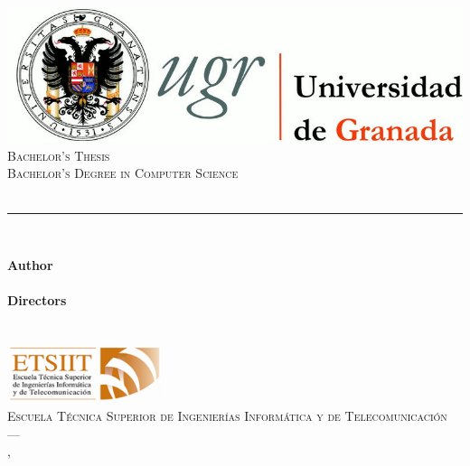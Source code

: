 



\begin{titlepage}
 
    \newlength{\centeroffset}
    \setlength{\centeroffset}{-0.5\oddsidemargin}
    \addtolength{\centeroffset}{0.5\evensidemargin}
    \thispagestyle{empty}

    \noindent\hspace*{\centeroffset}\begin{minipage}{\textwidth}

    \centering
    \includegraphics[width=\textwidth]{gfx/logo_ugr.jpg}\\[2.4cm]

    \textsc{ \Large Bachelor's Thesis\\[0.2cm]}
    \textsc{ Bachelor's Degree in Computer Science}\\[1cm]
    \begingroup
        \color{Maroon}{\Huge\myTitle} \\
    \endgroup
    \noindent\rule[-1ex]{\textwidth}{3pt}\\[3.5ex]
    {\large\bfseries \mySubtitle}
    \end{minipage}

    \vspace{2.5cm}
    \noindent\hspace*{\centeroffset}\begin{minipage}{\textwidth}
    \centering

    \textbf{Author}\\ {\spacedlowsmallcaps{\myName}}\\[2.5ex]
    \textbf{Directors}\\
    {\spacedlowsmallcaps{\myProf}\\
    \spacedlowsmallcaps{\myOtherProf}}\\[2.5cm]
    \includegraphics[width=0.35\textwidth]{gfx/etsiit_logo.png}\\[0.1cm]
    \textsc{Escuela Técnica Superior de Ingenierías Informática y de Telecomunicación}\\
    \textsc{---}\\
    \myLocation, \myTime
    \end{minipage}

\end{titlepage}